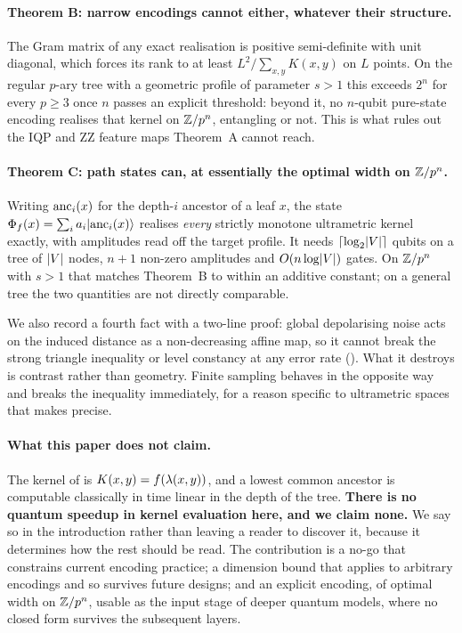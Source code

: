 \paragraph{Theorem B: narrow encodings cannot either, whatever their structure.}
The Gram matrix of any exact realisation is positive semi-definite with unit diagonal,
which forces its rank to at least $L^{2} / \sum_{x,y} K(x,y)$ on $L$ points. On the regular
$p$-ary tree with a geometric profile of parameter $s > 1$ this exceeds $2^{n}$ for
every $p \ge 3$ once $n$ passes an explicit threshold: beyond it, no $n$-qubit
pure-state encoding realises that kernel on $\mathbb{Z}/p^{n}$, entangling or not. This is what rules out the IQP and ZZ
feature maps Theorem~A cannot reach.

\paragraph{Theorem C: path states can, at essentially the optimal width on $\mathbb{Z}/p^{n}$.}
Writing $\operatorname{anc}_i(x)$ for the depth-$i$ ancestor of a leaf $x$, the state
$\Phi_f(x) = \sum_i a_i \lvert \operatorname{anc}_i(x) \rangle$ realises \emph{every} strictly monotone
ultrametric kernel exactly, with amplitudes read off the target profile. It needs
$\lceil \log_2 \lvert V\rvert \rceil$ qubits on a tree of $\lvert V\rvert$ nodes, $n+1$ non-zero
amplitudes and $O(n \log \lvert V\rvert)$ gates. On $\mathbb{Z}/p^{n}$ with $s > 1$ that matches
Theorem~B to within an additive constant; on a general tree the two quantities are not
directly comparable.

We also record a fourth fact with a two-line proof: global depolarising noise acts on
the induced distance as a non-decreasing affine map, so it cannot break the strong
triangle inequality or level constancy at any error rate ().
What it destroys is contrast rather than geometry. Finite sampling behaves in the
opposite way and breaks the inequality immediately, for a reason specific to ultrametric
spaces that  makes precise.

\paragraph{What this paper does not claim.}
The kernel of  is $K(x,y) = f(\lambda(x,y))$, and a lowest
common ancestor is computable classically in time linear in the depth of the tree.
\textbf{There is no quantum speedup in kernel evaluation here, and we claim none.} We
say so in the introduction rather than leaving a reader to discover it, because it
determines how the rest should be read. The contribution is a no-go that constrains
current encoding practice; a dimension bound that applies to arbitrary encodings and so
survives future designs; and an explicit encoding, of optimal width on $\mathbb{Z}/p^{n}$, usable
as the input stage of deeper quantum models, where no closed form survives the
subsequent layers.

